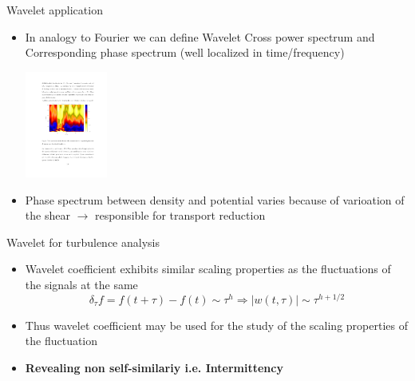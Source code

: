 \documentclass[t,10pt]{beamer}
\begin{document}
\begin{frame}{Wavelet application}
\begin{itemize}
\item In analogy to Fourier we can define Wavelet Cross power spectrum
  and Corresponding phase spectrum (well localized in time/frequency)

\begin{center}
\includegraphics[height=3.5cm]{wavelet-phase}
\end{center}

\item Phase spectrum between density and potential varies because of
  varioation of the shear $\rightarrow$ responsible for transport
  reduction {\footnotesize\parencite{Antoni:2000bn}}

\end{itemize}
\end{frame}


\begin{frame}{Wavelet for turbulence analysis}
 \begin{itemize}[<+->]
  \item Wavelet coefficient exhibits similar
    scaling properties as the fluctuations of the signals at the same
\begin{equation*}
\delta_{\tau} f = f(t+\tau)-f(t) \sim \tau^h \Rightarrow |w(t,\tau)|\sim\tau^{h+1/2}
\end{equation*}
\item Thus wavelet coefficient may be used for the study of the
  scaling properties of the fluctuation

\item \textcolor{tascarletred}{\textbf{Revealing non
      self-similariy i.e. Intermittency}}


\end{itemize}
\end{frame}
\end{document}
